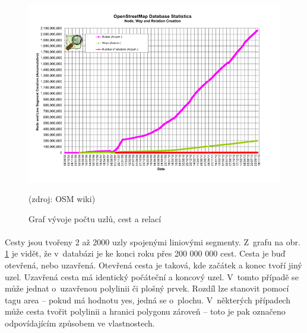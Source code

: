 \documentclass[11pt,a4paper,titlepage,oneside]{book}
\begin{document}
		\begin{figure}[!h]
			\begin{center}
				\includegraphics[width=12cm]{obrazky/osm_stat_elements.png}
				\caption{Graf vývoje počtu uzlů, cest a relací}(zdroj: \ac{OSM} wiki\cite{osm_wiki_stats})
				\label{fig:elements}
			\end{center}
		\end{figure}


		\paragraph{} Cesty jsou tvořeny 2 až 2000 uzly spojenými liniovými segmenty. Z~grafu na obr. \ref{fig:elements} je vidět, že v~databázi je ke konci roku přes 200 000 000 cest.  Cesta je buď otevřená, nebo uzavřená. Otevřená cesta je taková, kde začátek a konec tvoří jiný uzel. Uzavřená cesta má identický počáteční a koncový uzel. V~tomto případě se může jednat o~uzavřenou polylinii či plošný prvek. Rozdíl lze stanovit pomocí tagu area -- pokud má hodnotu yes, jedná se o~plochu. V~některých případech může cesta tvořit polylinii a hranici polygonu zároveň -- toto je pak označeno odpovídajícím způsobem ve vlastnostech.
\end{document}
